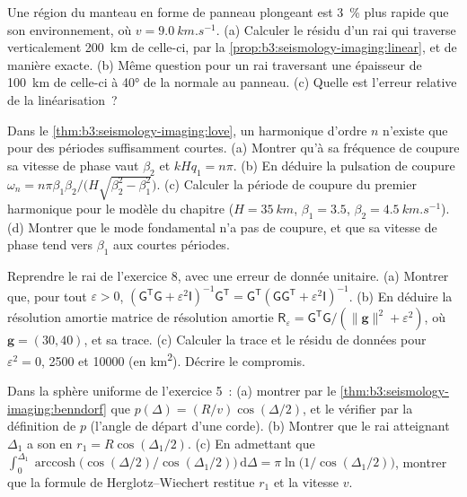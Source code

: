 \begin{exercise}[$\star\star$]\label{exo:b3:seismology-imaging:9}
Une région du manteau en forme de panneau plongeant est \qty{3}{\percent} plus rapide que son environnement,
où $v = \qty{9.0}{km.s^{-1}}$. (a) Calculer le résidu d'un rai qui traverse
verticalement \qty{200}{km} de celle-ci, par la \cref{prop:b3:seismology-imaging:linear},
et de manière exacte. (b) Même question pour un rai traversant une épaisseur de \qty{100}{km} de celle-ci à
\ang{40} de la normale au panneau. (c) Quelle est l'erreur relative de la
linéarisation~?
\end{exercise}

\begin{exercise}[$\star\star\star$]\label{exo:b3:seismology-imaging:10}
Dans le \cref{thm:b3:seismology-imaging:love}, un harmonique d'ordre $n$ n'existe que
pour des périodes suffisamment courtes. (a) Montrer qu'à sa fréquence de coupure sa vitesse de phase vaut
$\beta_2$ et $kHq_1 = n\pi$. (b) En déduire la pulsation de coupure
$\omega_n = n\pi\beta_1\beta_2/\bigl(H\sqrt{\beta_2^2 - \beta_1^2}\bigr)$.
(c) Calculer la période de coupure du premier harmonique pour le modèle du chapitre
($H = \qty{35}{km}$, $\beta_1 = 3.5$, $\beta_2 = \qty{4.5}{km.s^{-1}}$).
(d) Montrer que le mode fondamental n'a pas de coupure, et que sa vitesse de phase
tend vers $\beta_1$ aux courtes périodes.
\end{exercise}

\begin{exercise}[$\star\star\star$]\label{exo:b3:seismology-imaging:11}
Reprendre le rai de l'exercice 8, avec une erreur de donnée unitaire. (a) Montrer que, pour tout
$\varepsilon > 0$, $(\mathsf G^{\mathsf T}\mathsf G + \varepsilon^2\mathsf
I)^{-1}\mathsf G^{\mathsf T} = \mathsf G^{\mathsf T}(\mathsf G\mathsf
G^{\mathsf T} + \varepsilon^2\mathsf I)^{-1}$. (b) En déduire la résolution amortie
matrice de résolution amortie $\mathsf R_\varepsilon = \mathsf G^{\mathsf T}\mathsf G/(\|\mathbf g\|^2 +
\varepsilon^2)$, où $\mathbf g = (30, 40)$, et sa trace. (c) Calculer la
trace et le résidu de données pour $\varepsilon^2 = 0$, 2500 et \num{10000}
(en \unit{km^2}). Décrire le compromis.
\end{exercise}

\begin{exercise}[$\star\star\star$]\label{exo:b3:seismology-imaging:12}
Dans la sphère uniforme de l'exercice 5~: (a) montrer par le
\cref{thm:b3:seismology-imaging:benndorf} que $p(\Delta) = (R/v)\cos(\Delta/2)$,
et le vérifier par la définition de $p$ (l'angle de départ d'une corde).
(b) Montrer que le rai atteignant $\Delta_1$ a son  en $r_1 = R\cos(\Delta_1/2)$.
(c) En admettant que $\int_0^{\Delta_1}\operatorname{arccosh}\bigl(\cos(\Delta/2)
/\cos(\Delta_1/2)\bigr)\,\mathrm d\Delta = \pi\ln\bigl(1/\cos(\Delta_1/2)\bigr)$,
montrer que la formule de Herglotz--Wiechert restitue $r_1$ et la vitesse $v$.
\end{exercise}


